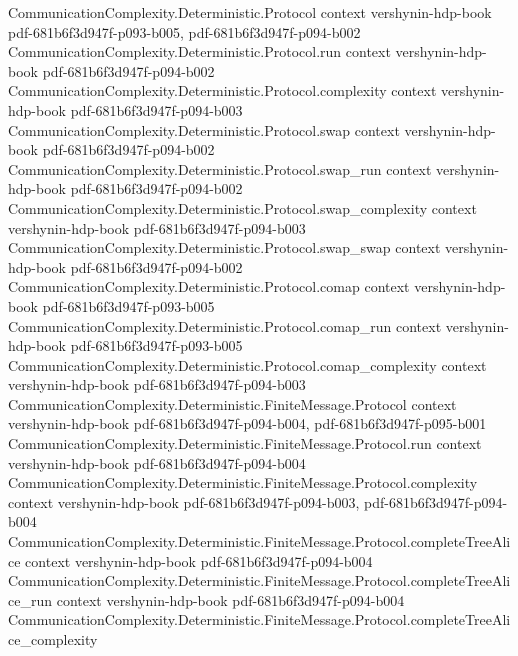 \begin{theorem}
\proofstep
  {CommunicationComplexity.Deterministic.Protocol}
  {context}
  {vershynin-hdp-book}
  {pdf-681b6f3d947f-p093-b005,
    pdf-681b6f3d947f-p094-b002}
\proofstep
  {CommunicationComplexity.Deterministic.Protocol.run}
  {context}
  {vershynin-hdp-book}
  {pdf-681b6f3d947f-p094-b002}
\proofstep
  {CommunicationComplexity.Deterministic.Protocol.complexity}
  {context}
  {vershynin-hdp-book}
  {pdf-681b6f3d947f-p094-b003}
\proofstep
  {CommunicationComplexity.Deterministic.Protocol.swap}
  {context}
  {vershynin-hdp-book}
  {pdf-681b6f3d947f-p094-b002}
\proofstep
  {CommunicationComplexity.Deterministic.Protocol.swap_run}
  {context}
  {vershynin-hdp-book}
  {pdf-681b6f3d947f-p094-b002}
\proofstep
  {CommunicationComplexity.Deterministic.Protocol.swap_complexity}
  {context}
  {vershynin-hdp-book}
  {pdf-681b6f3d947f-p094-b003}
\proofstep
  {CommunicationComplexity.Deterministic.Protocol.swap_swap}
  {context}
  {vershynin-hdp-book}
  {pdf-681b6f3d947f-p094-b002}
\proofstep
  {CommunicationComplexity.Deterministic.Protocol.comap}
  {context}
  {vershynin-hdp-book}
  {pdf-681b6f3d947f-p093-b005}
\proofstep
  {CommunicationComplexity.Deterministic.Protocol.comap_run}
  {context}
  {vershynin-hdp-book}
  {pdf-681b6f3d947f-p093-b005}
\proofstep
  {CommunicationComplexity.Deterministic.Protocol.comap_complexity}
  {context}
  {vershynin-hdp-book}
  {pdf-681b6f3d947f-p094-b003}
\proofstep
  {CommunicationComplexity.Deterministic.FiniteMessage.Protocol}
  {context}
  {vershynin-hdp-book}
  {pdf-681b6f3d947f-p094-b004,
    pdf-681b6f3d947f-p095-b001}
\proofstep
  {CommunicationComplexity.Deterministic.FiniteMessage.Protocol.run}
  {context}
  {vershynin-hdp-book}
  {pdf-681b6f3d947f-p094-b004}
\proofstep
  {CommunicationComplexity.Deterministic.FiniteMessage.Protocol.complexity}
  {context}
  {vershynin-hdp-book}
  {pdf-681b6f3d947f-p094-b003,
    pdf-681b6f3d947f-p094-b004}
\proofstep
  {CommunicationComplexity.Deterministic.FiniteMessage.Protocol.completeTreeAlice}
  {context}
  {vershynin-hdp-book}
  {pdf-681b6f3d947f-p094-b004}
\proofstep
  {CommunicationComplexity.Deterministic.FiniteMessage.Protocol.completeTreeAlice_run}
  {context}
  {vershynin-hdp-book}
  {pdf-681b6f3d947f-p094-b004}
\proofstep
  {CommunicationComplexity.Deterministic.FiniteMessage.Protocol.completeTreeAlice_complexity}

\end{theorem}
